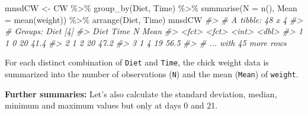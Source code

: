 \documentclass[
  14pt,
]{memoir}
\newenvironment{Shaded}{\begin{snugshade}}{\end{snugshade}}
\newcommand{\AttributeTok}[1]{\textcolor[rgb]{0.77,0.63,0.00}{#1}}
\newcommand{\CommentTok}[1]{\textcolor[rgb]{0.56,0.35,0.01}{\textit{#1}}}
\newcommand{\FunctionTok}[1]{\textcolor[rgb]{0.00,0.00,0.00}{#1}}
\newcommand{\NormalTok}[1]{#1}
\newcommand{\OtherTok}[1]{\textcolor[rgb]{0.56,0.35,0.01}{#1}}
\newcommand{\SpecialCharTok}[1]{\textcolor[rgb]{0.00,0.00,0.00}{#1}}
\begin{document}
\begin{Shaded}
\begin{Highlighting}[]
\NormalTok{mnsdCW }\OtherTok{\textless{}{-}}\NormalTok{ CW }\SpecialCharTok{\%\textgreater{}\%} 
  \FunctionTok{group\_by}\NormalTok{(Diet, Time) }\SpecialCharTok{\%\textgreater{}\%} 
  \FunctionTok{summarise}\NormalTok{(}\AttributeTok{N =} \FunctionTok{n}\NormalTok{(), }\AttributeTok{Mean =} \FunctionTok{mean}\NormalTok{(weight)) }\SpecialCharTok{\%\textgreater{}\%} 
  \FunctionTok{arrange}\NormalTok{(Diet, Time)}
\NormalTok{mnsdCW}
\CommentTok{\#\textgreater{} \# A tibble: 48 x 4}
\CommentTok{\#\textgreater{} \# Groups:   Diet [4]}
\CommentTok{\#\textgreater{}   Diet  Time      N  Mean}
\CommentTok{\#\textgreater{}   \textless{}fct\textgreater{} \textless{}fct\textgreater{} \textless{}int\textgreater{} \textless{}dbl\textgreater{}}
\CommentTok{\#\textgreater{} 1 1     0        20  41.4}
\CommentTok{\#\textgreater{} 2 1     2        20  47.2}
\CommentTok{\#\textgreater{} 3 1     4        19  56.5}
\CommentTok{\#\textgreater{} \# ... with 45 more rows}
\end{Highlighting}
\end{Shaded}

For each distinct combination of \texttt{Diet} and \texttt{Time}, the chick weight data is summarized
into the number of observations (\texttt{N}) and the mean (\texttt{Mean}) of \texttt{weight}.

\textbf{Further summaries:} Let's also calculate the standard deviation, median, minimum and maximum values but only
at days 0 and 21.
\end{document}
